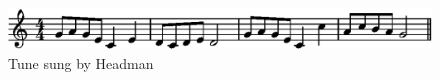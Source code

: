 \begin{figure}
\includegraphics{Lahu_tune}\centering
\caption{Tune sung by Headman}
\label{fig:score1}
\end{figure}
